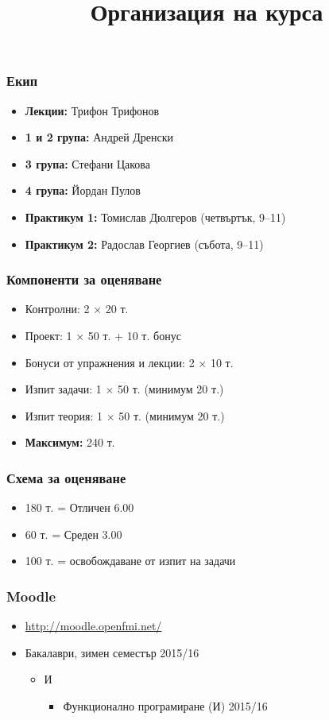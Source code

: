 \documentclass{beamer}
\title{Организация на курса}
\begin{document}
\begin{frame}
  \titlepage
\end{frame}

\begin{frame}
  \frametitle{Екип}

  \begin{itemize}
  \item \textbf{Лекции:} Трифон Трифонов
  \item \textbf{1 и 2 група:} Андрей Дренски
  \item \textbf{3 група:} Стефани Цакова
  \item \textbf{4 група:} Йордан Пулов
  \item \textbf{Практикум 1:} Томислав Дюлгеров (четвъртък, 9--11)
  \item \textbf{Практикум 2:} Радослав Георгиев (събота, 9--11)
  \end{itemize}
\end{frame}

\begin{frame}
  \frametitle{Компоненти за оценяване}

  \begin{itemize}
  \item Контролни: 2 $\times$ 20 т.
  \item Проект: 1 $\times$ 50 т. + 10 т. бонус
  \item Бонуси от упражнения и лекции: 2 $\times$ 10 т.
  \item Изпит задачи: 1 $\times$ 50 т. (минимум 20 т.)
  \item Изпит теория: 1 $\times$ 50 т. (минимум 20 т.)
  \item \textbf{Максимум:} 240 т.
  \end{itemize}
\end{frame}

\begin{frame}
  \frametitle{Схема за оценяване}

  \begin{itemize}
  \item 180 т. = Отличен 6.00
  \item 60 т. = Среден 3.00
  \item 100 т. = освобождаване от изпит на задачи
  \end{itemize}
\end{frame}

\begin{frame}
  \frametitle{Moodle}
  
  \begin{itemize}
  \item \url{http://moodle.openfmi.net/}
  \item Бакалаври, зимен семестър 2015/16
    \begin{itemize}
    \item И
      \begin{itemize}
      \item Функционално програмиране (И) 2015/16
      \end{itemize}
    \end{itemize}
  \end{itemize}
\end{frame}
\end{document}
